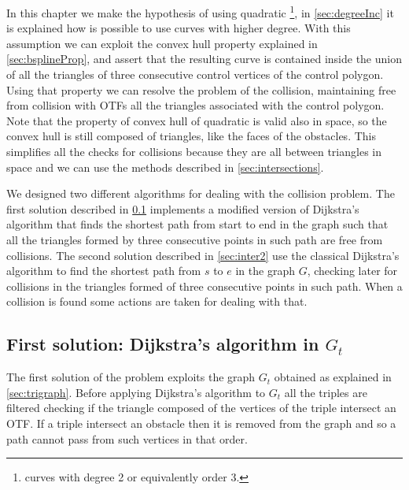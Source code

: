 \documentclass[dissertation.tex]{subfiles}
\begin{document}
In this chapter we make the hypothesis of using
quadratic \bss\footnote{\bss curves with degree 2 or equivalently order 3.}, in
\cref{sec:degreeInc} it is explained how is possible to use curves with
higher degree. With this assumption we can exploit the convex hull
property explained in \cref{sec:bsplineProp}, and assert that the
resulting curve is contained inside the union of all the triangles of
three consecutive control vertices of the control
polygon. Using that property we can resolve the problem of the
collision, maintaining free 
from collision with \acp{OTF} all the triangles associated with the control
polygon. Note that the property of convex
hull of quadratic
\bss is valid also in space, so the convex hull is still composed
of triangles, like the faces of the
obstacles. This simplifies all the checks for collisions because they
are all between triangles in space and we can use the methods
described in \cref{sec:intersections}.

We designed two different algorithms for dealing with the collision
problem. The first solution described in \cref{sec:inter1} implements
a modified version of Dijkstra's
algorithm that finds the shortest path from start to end in the graph
such that all the triangles formed by three consecutive points in such path
are free from collisions. The second solution described in
\cref{sec:inter2} use the classical Dijkstra's algorithm to find
the shortest path from $s$ to $e$ in the graph $G$, checking later for
collisions in the triangles formed of three consecutive points in such
path. When a collision is found some actions are taken for dealing
with that.

\subsection{First solution: Dijkstra's algorithm in $G_t$}\label{sec:inter1}
The first solution of the problem exploits the graph $G_t$ obtained as
explained in \cref{sec:trigraph}. Before applying Dijkstra's algorithm
to $G_t$ all the triples are filtered checking if the
triangle composed of the vertices of the triple intersect an
\ac{OTF}. If a triple intersect an obstacle then it is removed from the
graph
and so a path cannot pass from such vertices in that order.
\end{document}
